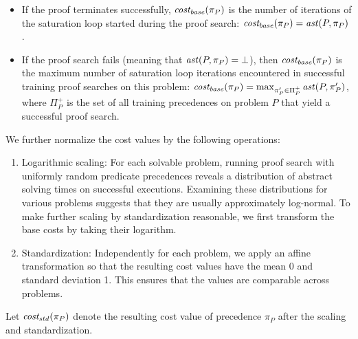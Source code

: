 \documentclass[a4paper]{easychair}
\begin{document}
\begin{itemize}
	\item If the proof terminates successfully,
	\(\operatorname{\mathit{cost_{base}}}(\pi_P)\) is the number of iterations of the saturation loop
	started during the proof search: \(\operatorname{\mathit{cost_{base}}}(\pi_P) = \operatorname{\mathit{ast}}(P, \pi_P)\).
	\item If the proof search fails (meaning that \(\operatorname{\mathit{ast}}(P, \pi_P) = \bot\)),
	then \(\operatorname{\mathit{cost_{base}}}(\pi_P)\) is the maximum number
	of saturation loop iterations encountered in successful training proof searches on this problem:
	\(\operatorname{\mathit{cost_{base}}}(\pi_P) = \max_{\pi_P' \in \Pi^+_P} \operatorname{\mathit{ast}}(P, \pi_P')\),
	where \(\Pi^+_P\) is the set of all training precedences on problem \(P\)
	that yield a successful proof search.
\end{itemize}
We further normalize the cost values by the following operations:
\begin{enumerate}
	\item Logarithmic scaling:
	For each solvable problem, running proof search with uniformly random predicate precedences
	reveals a distribution of abstract solving times on successful executions.
	Examining these distributions for various problems suggests that they are usually
	approximately log-normal.
	To make further scaling by standardization reasonable,
	we first transform the base costs by taking their logarithm.
	\item Standardization: %
	Independently for each problem,
	we apply an affine transformation so that the resulting cost values
	have the mean 0 and standard deviation 1.
	This ensures that the values are comparable across problems.
\end{enumerate}
Let \(\operatorname{\mathit{cost_{std}}}(\pi_P)\) denote the resulting cost value of precedence \(\pi_P\)
after the scaling and standardization.
\end{document}
